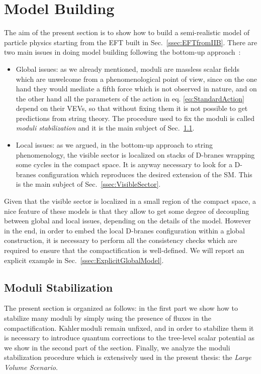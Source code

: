 \documentclass[12pt,a4paper]{book}
\newcommand{\Kahler}{\ensuremath{\text{K}\ddot{\text{a}}\text{hler}\,}}
\begin{document}
\section{Model Building}
\label{sec:ModelBuilding}

The aim of the present section is to show how to build a semi-realistic model of particle physics starting from the EFT built in Sec.~\ref{ssec:EFTfromIIB}. There are two main issues in doing model building following the bottom-up approach~\cite{Aldazabal:2000sa}:
\begin{itemize}
 \item Global issues: as we already mentioned, moduli are massless scalar fields which are unwelcome from a phenomenological point of view, since on the one hand they would mediate a fifth force which is not observed in nature, and on the other hand all the parameters of the action in eq. \eqref{eq:StandardAction} depend on their VEVs, so that without fixing them it is not possible to get predictions from string theory. The procedure used to fix the moduli is called \textit{moduli stabilization} and it is the main subject of Sec.~\ref{ssec:ModuliStabilization}.
 \item Local issues: as we argued, in the bottom-up approach to string phenomenology, the visible sector is localized on stacks of D-branes wrapping some cycles in the compact space. It is anyway necessary to look for a D-branes configuration which reproduces the desired extension of the SM. This is the main subject of Sec.~\ref{ssec:VisibleSector}.
\end{itemize}

Given that the visible sector is localized in a small region of the compact space, a nice feature of these models is that they allow to get some degree of decoupling between global and local issues, depending on the details of the model. However in the end, in order to embed the local D-branes configuration within a global construction, it is necessary to perform all the consistency checks which are required to ensure that the compactification is well-defined. We will report an explicit example in Sec.~\ref{ssec:ExplicitGlobalModel}.


\subsection{Moduli Stabilization}
\label{ssec:ModuliStabilization}

The present section is organized as follows: in the first part we show how to stabilize many moduli by simply using the presence of fluxes in the compactification. \Kahler moduli remain unfixed, and in order to stabilize them it is necessary to introduce quantum corrections to the tree-level scalar potential as we show in the second part of the section. Finally, we analyze the moduli stabilization procedure which is extensively used in the present thesis: the \textit{Large Volume Scenario}.
\end{document}
